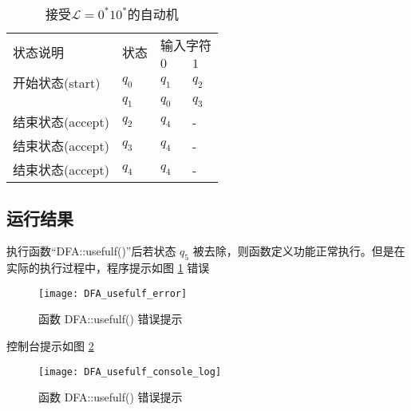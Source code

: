 \begin{table}[!htbp]
    \caption{接受{$\mathcal{L}=0^*10^*$}的自动机{\cite{book1}}}
    \label{tab:DFA4_1}
    \centering
    \small%
    \setlength{\tabcolsep}{4pt}%
    \renewcommand{\arraystretch}{1.2}%
        \begin{tabular}{l p{4em}<{\centering} p{3em}<{\centering} p{3em}<{\centering}}
        \toprule %
        \multirow{2}{*}{状态说明} & \multirow{2}{*}{状态} & \multicolumn{2}{c}{输入字符} \\
		\cline{3-4}      &    &$0$ & $1$  \\
        \midrule%
        开始状态(start)  & $q_0$ & $q_1$   & $q_2$   \\
                        & $q_1$ & $q_0$   & $q_3$   \\
        结束状态(accept) & $q_2$ & $q_4$   & -   \\
        结束状态(accept) & $q_3$ & $q_4$   & -   \\
        结束状态(accept) & $q_4$ & $q_4$   & -   \\
        \bottomrule%
    \end{tabular}
\end{table}

\subsection{运行结果}

执行函数“DFA::usefulf()”后若状态 $q_5$ 被去除，则函数定义功能正常执行。但是在实际的执行过程中，程序提示如图 \ref{fig::usefulf_error} 错误 

\begin{figure}[!htbp]
    \centering
    \texttt{[image: DFA\_usefulf\_error]}
    \caption{函数 DFA::usefulf() 错误提示}
    \label{fig::usefulf_error}
\end{figure}
控制台提示如图 \ref{fig::usefulf_console_log}
\begin{figure}[!htbp]
    \centering
    \texttt{[image: DFA\_usefulf\_console\_log]}
    \caption{函数 DFA::usefulf() 错误提示}
    \label{fig::usefulf_console_log}
\end{figure}

